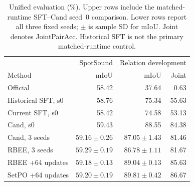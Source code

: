 \begin{table}[t]
\centering
\caption{Unified evaluation (\%). Upper rows include the matched-runtime SFT--Cand seed~0 comparison. Lower rows report all three fixed seeds; $\pm$ is sample SD for mIoU. Joint denotes JointPairAcc. Historical SFT is not the primary matched-runtime control.}
\label{tab:training}
\small
\setlength{\tabcolsep}{3pt}
\begin{tabular}{@{}lrrr@{}}
\toprule
 & SpotSound & \multicolumn{2}{c}{Relation development}\\
Method & mIoU & mIoU & Joint\\
\midrule
Official & 58.42 & 37.64 & 0.63\\
Historical SFT, s0 & 58.76 & 75.34 & 55.63\\
Current SFT, s0 & 58.42 & 74.58 & 53.13\\
Cand, s0 & 59.43 & 88.55 & 84.38\\
\midrule
Cand, 3 seeds & $59.16\pm0.26$ & $87.05\pm1.43$ & 81.46\\
RBEE, 3 seeds & $59.29\pm0.19$ & $86.78\pm1.11$ & 81.67\\
RBEE +64 updates & $59.18\pm0.13$ & $89.04\pm0.13$ & 85.63\\
SetPO +64 updates & $59.20\pm0.19$ & $89.81\pm0.42$ & 86.67\\
\bottomrule
\end{tabular}
\end{table}
